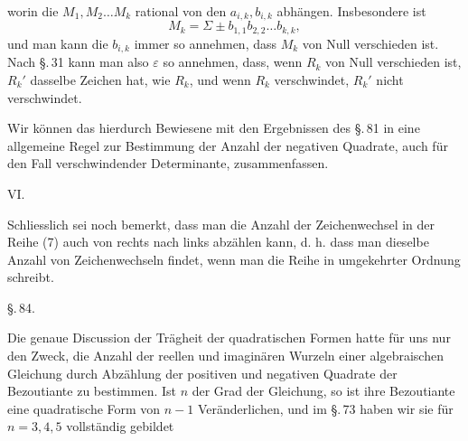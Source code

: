 worin die $M_1, M_2 \ldots M_k$ rational von den $a_{i,k}, b_{i,k}$ abhängen. Insbesondere ist
\[
M_k = \Sigma \pm b_{1,1} b_{2,2} \ldots b_{k,k},
\]
und man kann die $b_{i,k}$ immer so annehmen, dass $M_k$ von Null verschieden ist. Nach \S.\,31 kann man also $\varepsilon$ so annehmen, dass, wenn $R_k$ von Null verschieden ist, $R_k'$ dasselbe Zeichen hat, wie $R_k$, und wenn $R_k$ verschwindet, $R_k'$ nicht verschwindet.

Wir können das hierdurch Bewiesene mit den Ergebnissen des \S.\,81 in eine allgemeine Regel zur Bestimmung der Anzahl der negativen Quadrate, auch für den Fall verschwindender Determinante, zusammenfassen.

VI. 

Schliesslich sei noch bemerkt, dass man die Anzahl der Zeichenwechsel in der Reihe (7) auch von rechts nach links abzählen kann, d. h. dass man dieselbe Anzahl von Zeichenwechseln findet, wenn man die Reihe in umgekehrter Ordnung schreibt.

\begin{center}
\S.\,84.

\end{center}

Die genaue Discussion der Trägheit der quadratischen Formen hatte für uns nur den Zweck, die Anzahl der reellen und imaginären Wurzeln einer algebraischen Gleichung durch Abzählung der positiven und negativen Quadrate der Bezoutiante zu bestimmen. Ist $n$ der Grad der Gleichung, so ist ihre Bezoutiante eine quadratische Form von $n - 1$ Veränderlichen, und im \S.\,73 haben wir sie für $n = 3, 4, 5$ vollständig gebildet

